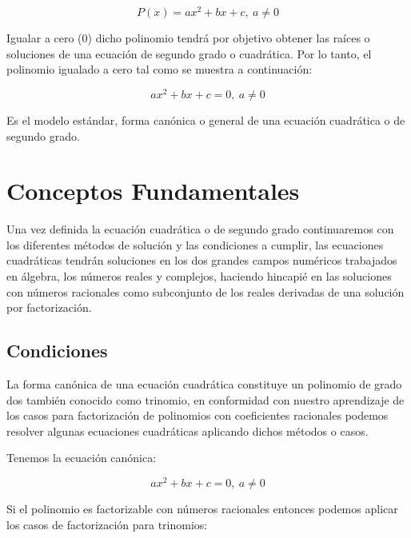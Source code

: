 \documentclass[A4paper, 10pt, oneside]{book}
\begin{document}
	$$P(x)=ax^2+bx+c, \ a \neq 0$$
	
	Igualar a cero (0) dicho polinomio tendrá por objetivo obtener las raíces o soluciones de una ecuación de segundo grado o cuadrática. Por lo tanto, el polinomio igualado a cero tal como se muestra a continuación: 
	
	$$ax^2+bx+c=0, \ a \neq 0$$
	
	Es el modelo estándar, forma canónica o    general de una ecuación cuadrática o de segundo grado. 
	
	\section{Conceptos Fundamentales}
	Una vez definida la ecuación cuadrática o de segundo grado continuaremos con los diferentes métodos de solución y las condiciones a cumplir, las ecuaciones cuadráticas tendrán soluciones en los dos grandes campos numéricos trabajados en álgebra, los números reales y complejos, haciendo hincapié en las soluciones con números racionales como subconjunto de los reales derivadas de una solución por factorización. 
	
	\subsection{Condiciones}
	La forma canónica de una ecuación cuadrática constituye un polinomio de grado dos también conocido como trinomio, en conformidad con nuestro aprendizaje de los casos para factorización de polinomios con coeficientes racionales podemos resolver algunas ecuaciones cuadráticas aplicando dichos métodos o casos. 
	
	Tenemos la ecuación canónica: 
	
	$$ax^2+bx+c=0, \ a \neq 0$$
	
	Si el polinomio es factorizable con números racionales entonces podemos aplicar los casos de factorización para trinomios:
	
\end{document}
